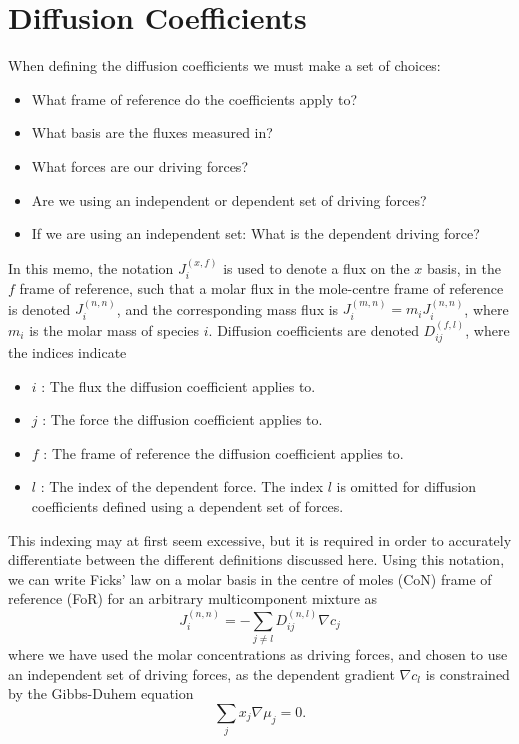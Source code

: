 \section{Diffusion Coefficients}\label{sec:diffusion}

When defining the diffusion coefficients we must make a set of choices:
\begin{itemize}
    \item What frame of reference do the coefficients apply to?
    \item What basis are the fluxes measured in?
    \item What forces are our driving forces?
    \item Are we using an independent or dependent set of driving forces?
    \item If we are using an independent set: What is the dependent driving force?
\end{itemize}

In this memo, the notation $J_i^{(x, f)}$ is used to denote a flux on the $x$ basis, in the $f$ frame of reference, such that a molar flux in the mole-centre frame of reference is denoted $J_i^{(n, n)}$, and the corresponding mass flux is $J_i^{(m, n)}  = m_i J_i^{(n, n)}$, where $m_i$ is the molar mass of species $i$. Diffusion coefficients are denoted $D_{ij}^{(f,l)}$, where the indices indicate 

\begin{itemize}
    \item $i$ : The flux the diffusion coefficient applies to.
    \item $j$ : The force the diffusion coefficient applies to.
    \item $f$ : The frame of reference the diffusion coefficient applies to.
    \item $l$ : The index of the dependent force. The index $l$ is omitted for diffusion coefficients defined using a dependent set of forces.
\end{itemize}

This indexing may at first seem excessive, but it is required in order to accurately differentiate between the different definitions discussed here. Using this notation, we can write Ficks' law on a molar basis in the centre of moles (CoN) frame of reference (FoR) for an arbitrary multicomponent mixture as
\begin{equation}
    J_i^{(n,n)} = - \sum_{j \neq l} D_{ij}^{(n,l)} \nabla c_j
\end{equation}
where we have used the molar concentrations as driving forces, and chosen to use an independent set of driving forces, as the dependent gradient $\nabla c_l$ is constrained by the Gibbs-Duhem equation
\begin{equation}
    \sum_{j} x_j \nabla \mu_j = 0.
\end{equation}

